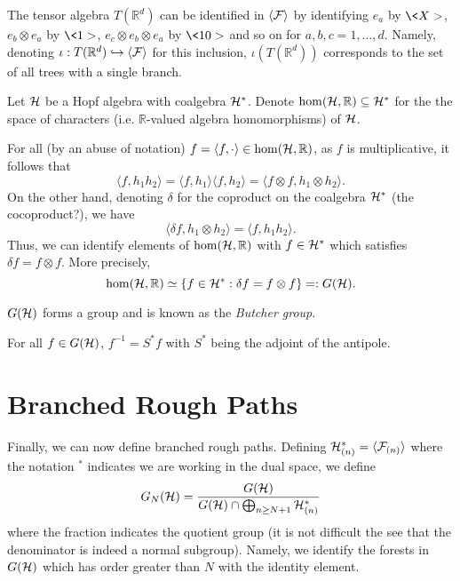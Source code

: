 \documentclass[11pt]{style/preprint}
\begin{document}
The tensor algebra \(T(\mathbb{R}^d)\) can be identified in \(\langle {\mathcal F} \rangle\) by identifying 
\(e_a\) by \(\<X>\), \(e_b \otimes e_a\) by \(\<1>\), \(e_c \otimes e_b \otimes e_a\) by \(\<10>\)
and so on for \(a, b, c = 1, \dots, d\). Namely, denoting 
\(\iota : T(\mathbb{R}^d) \hookrightarrow \langle {\mathcal F} \rangle\) for this inclusion, 
\(\iota(T(\mathbb{R}^d))\) corresponds to the set of all trees with a single branch.

\begin{definition}
  Let \({\mathcal H}\) be a Hopf algebra with coalgebra \({\mathcal H}^*\). Denote \(\hom({\mathcal H}, \mathbb{R}) \subseteq {\mathcal H}^*\) 
  for the the space of characters (i.e. \(\mathbb{R}\)-valued algebra homomorphisms) of \({\mathcal H}\).
\end{definition}

For all (by an abuse of notation) \(f = \langle f, \cdot \rangle \in \hom({\mathcal H}, \mathbb{R})\), 
as \(f\) is multiplicative, it follows that 
\[\langle f, h_1 h_2\rangle = \langle f, h_1\rangle \langle f, h_2\rangle = 
  \langle f \otimes f, h_1 \otimes h_2\rangle.\]
On the other hand, denoting \(\delta\) for the coproduct on the coalgebra \({\mathcal H}^*\) (the cocoproduct?), we have 
\[\langle \delta f, h_1 \otimes h_2\rangle = \langle f, h_1 h_2\rangle.\] 
Thus, we can identify elements of \(\hom({\mathcal H}, \mathbb{R})\) with \(f \in {\mathcal H}^*\) which satisfies 
\(\delta f = f \otimes f\). More precisely, 
\[\hom({\mathcal H}, \mathbb{R}) \simeq \{f \in {\mathcal H}^* : \delta f = f \otimes f\} =: G({\mathcal H}).\]

\begin{definition}
  \(G({\mathcal H})\) forms a group and is known as the \textit{Butcher group}.
\end{definition}

\begin{proposition}
  For all \(f \in G({\mathcal H})\), \(f^{-1} = S^* f\) with \(S^*\) being the adjoint of the antipole.
\end{proposition}

\section{Branched Rough Paths}

Finally, we can now define branched rough paths. Defining \({\mathcal H}^*_{(n)} = \langle {\mathcal F}_{(n)}\rangle\) 
where the notation \(^*\) indicates we are working in the dual space, we define 
\[G_N({\mathcal H}) = \frac{G({\mathcal H})}{G({\mathcal H}) \cap \bigoplus_{n \ge N + 1} {\mathcal H}^*_{(n)}}\]
where the fraction indicates the quotient group (it is not difficult the see that the denominator 
is indeed a normal subgroup). Namely, we identify the forests in \(G({\mathcal H})\) which has order greater 
than \(N\) with the identity element.
\end{document}
